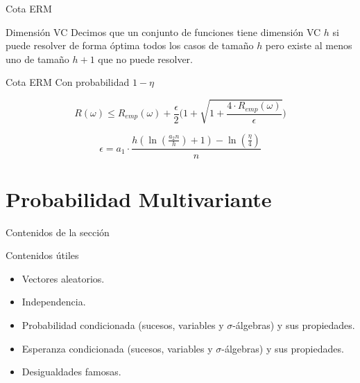 \documentclass[10pt]{beamer}
\begin{document}
\begin{frame}[fragile]{Cota ERM}
\vspace{10px}
\pause
{}

\begin{block}{Dimensión VC}
	Decimos que un conjunto de funciones tiene dimensión VC $h$ si puede resolver de forma óptima todos los casos de tamaño $h$ pero existe al menos uno de tamaño $h+1$ que no puede resolver.
\end{block}

\pause

\begin{block}{Cota ERM}
	Con probabilidad $1-\eta$
	
	$$R(\omega) \leq R_{emp}( \omega) + \frac{\epsilon}{2} \biggl( 1+\sqrt{1+\frac{4\cdot R_{emp}(\omega)}{\epsilon}} \biggl)$$
	
	\pause
	
	$$\epsilon = a_1 \cdot \frac{h(\ln (\frac{a_2 n}{h})+1) - \ln (\frac{\eta}{4})}{n}$$
\end{block}

\end{frame}

\section{Probabilidad Multivariante}

\begin{frame}[fragile]{Contenidos de la sección}
\vspace{10px}
\pause
{}

\begin{block}{Contenidos útiles}
	\begin{itemize}
		\item Vectores aleatorios.
		\pause
		\item Independencia.
		\pause
		\item Probabilidad condicionada (sucesos, variables y $\sigma$-álgebras) y sus propiedades.
		\pause
		\item Esperanza condicionada (sucesos, variables y $\sigma$-álgebras) y sus propiedades.
		\pause
		\item Desigualdades famosas.
	\end{itemize}
\end{block}

\end{frame}
\end{document}
